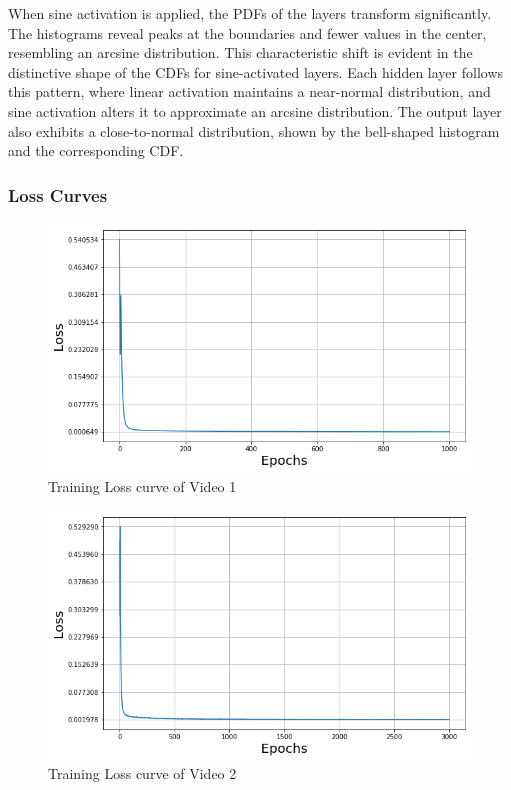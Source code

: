 \documentclass{ioereport}
\begin{document}
    When sine activation is applied, the PDFs of the layers transform significantly. The histograms reveal peaks at the boundaries and fewer values in the center, resembling an arcsine distribution. This characteristic shift is evident in the distinctive shape of the CDFs for sine-activated layers. Each hidden layer follows this pattern, where linear activation maintains a near-normal distribution, and sine activation alters it to approximate an arcsine distribution. The output layer also exhibits a close-to-normal distribution, shown by the bell-shaped histogram and the corresponding CDF. 

    \subsubsection{Loss Curves}
    \begin{figure}[H]
        \centering
        \includegraphics[width=\linewidth]{assets/video_loss_curves/very_very_short.png}
        \caption{Training Loss curve of Video 1}
        \label{fig:video-loss-curve-1}
    \end{figure}

    \begin{figure}[H]
        \centering
        \includegraphics[width=\linewidth]{assets/video_loss_curves/very_short.png}
        \caption{Training Loss curve of Video 2}
        \label{fig:video-loss-curve-2}
    \end{figure}
\end{document}
